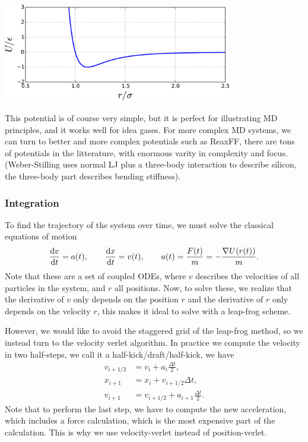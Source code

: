 \documentclass[a4paper, 11pt, notitlepage, english]{article}
\renewcommand{\d}{{\rm d}}
\begin{document}
\begin{center}
\includegraphics[width=0.75\textwidth]{1}
\end{center}

This potential is of course very simple, but it is perfect for illustrating MD principles, and it works well for idea gases. For more complex MD systems, we can turn to better and more complex potentials such as ReaxFF, there are tons of potentials in the litterature, with enormous varity in complexity and focus. (Weber-Stilling uses normal LJ plus a three-body interaction to describe silicon, the three-body part describes bending stiffness).

\subsubsection*{Integration}

To find the trajectory of the system over time, we must solve the classical equations of motion
$$\frac{\d v}{\d t} = a(t), \qquad \frac{\d x}{\d t} = v(t), \qquad a(t) = \frac{F(t)}{m} = -\frac{\nabla U(r(t))}{m}.$$
Note that these are a set of coupled ODEs, where $v$ describes the velocities of all particles in the system, and $r$ all positions. Now, to solve these, we realize that the derivative of $v$ only depends on the position $r$ and the derivative of $r$ only depends on the velocity $r$, this makes it ideal to solve with a leap-frog scheme. 

However, we would like to avoid the staggered grid of the leap-frog method, so we instead turn to the velocity verlet algorithm. In practice we compute the velocity in two half-steps, we call it a half-kick/draft/half-kick, we have
\begin{align*}
v_{i + 1/2} &= v_i + a_i \frac{\Delta t}{2}, \\
x_{i+1} &= x_i + v_{i+1/2}\Delta t, \\
v_{i + 1} &= v_{i + 1/2} + a_{i+1} \frac{\Delta t}{2}.
\end{align*}
Note that to perform the last step, we have to compute the new acceleration, which includes a force calculation, which is the most expensive part of the calculation. This is why we use velocity-verlet instead of position-verlet.
\end{document}
